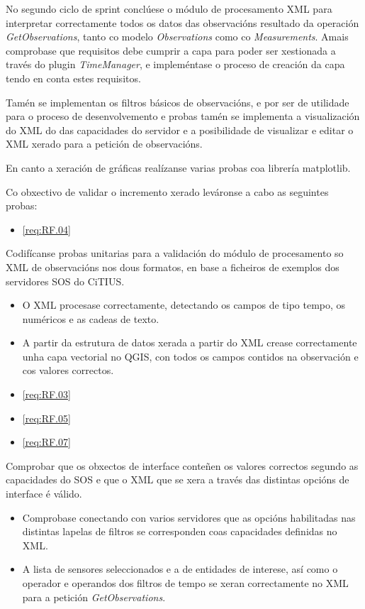 No segundo ciclo de sprint conclúese o módulo de procesamento XML para interpretar correctamente todos os datos das observacións resultado da operación \emph{GetObservations}, tanto co modelo \emph{Observations} como co \emph{Measurements}. Amais comprobase que requisitos debe cumprir a capa para poder ser xestionada a través do plugin \emph{TimeManager}, e impleméntase o proceso de creación da capa tendo en conta estes requisitos.

Tamén se implementan os filtros básicos de observacións, e por ser de utilidade para o proceso de desenvolvemento e probas tamén se implementa a visualización do XML do das capacidades do servidor e a posibilidade de visualizar e editar o XML xerado para a petición de observacións.

En canto a xeración de gráficas realízanse varias probas coa librería matplotlib.

Co obxectivo de validar o incremento xerado leváronse a cabo as seguintes probas:

		  {\begin{itemize}\item \ref{req:RF.04} \\\end{itemize}} %
		  {Codifícanse probas unitarias para a validación do módulo de procesamento so XML de observacións nos dous formatos, en base a ficheiros de exemplos dos servidores SOS do CiTIUS.} %
		  {\begin{itemize}
		  \item O XML procesase correctamente, detectando os campos de tipo tempo, os numéricos e as cadeas de texto.
		  \item A partir da estrutura de datos xerada a partir do XML crease correctamente unha capa vectorial no QGIS, con todos os campos contidos na observación e cos valores correctos.
		  \end{itemize}} %

		  {\begin{itemize}\item \ref{req:RF.03} \item \ref{req:RF.05} \item \ref{req:RF.07}\end{itemize}} %
		  {Comprobar que os obxectos de interface conteñen os valores correctos segundo as capacidades do SOS e que o XML que se xera a través das distintas opcións de interface é válido.} %
		  {\begin{itemize}
		  \item Comprobase conectando con varios servidores que as opcións habilitadas nas distintas lapelas de filtros se corresponden coas capacidades definidas no XML.
		  \item A lista de sensores seleccionados e a de entidades de interese, así como o operador e operandos dos filtros de tempo se xeran correctamente no XML para a petición \emph{GetObservations}.
		  \end{itemize}} %

